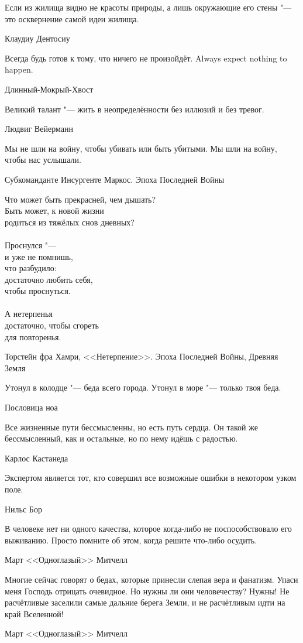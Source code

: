 \epigraph
{Если из жилища видно не красоты природы, а лишь окружающие его стены "--- это осквернение самой идеи жилища.}
{Клаудиу Дентосиу}

\epigraph{
{Всегда будь готов к тому, что ничего не произойдёт.}
{Always expect nothing to happen.}
}{Длинный-Мокрый-Хвост}

\epigraph
{Великий талант "--- жить в неопределённости без иллюзий и без тревог.}
{Людвиг Вейерманн}

\epigraph
{Мы не шли на войну, чтобы убивать или быть убитыми.
Мы шли на войну, чтобы нас услышали.}
{Субкоманданте Инсургенте Маркос.
Эпоха Последней Войны}

\epigraph
{Что может быть прекрасней, чем дышать?\\
Быть может, к новой жизни\\
родиться из тяжёлых снов дневных?\\
~\\
Проснулся "---\\
и уже не помнишь,\\
что разбудило:\\
достаточно любить себя,\\
чтобы проснуться.\\
~\\
А нетерпенья\\
достаточно, чтобы сгореть\\
для повторенья.}
{Торстейн фра Хамри, <<Нетерпение>>.
Эпоха Последней Войны, Древняя Земля}

\epigraph
{Утонул в колодце "--- беда всего города.
Утонул в море "--- только твоя беда.}
{Пословица ноа}

\epigraph
{Все жизненные пути бессмысленны, но есть путь сердца.
Он такой же бессмысленный, как и остальные, но по нему идёшь с радостью.}
{Карлос Кастанеда}

\epigraph
{Экспертом является тот, кто совершил все возможные ошибки в некотором узком поле.}
{Нильс Бор}

\epigraph
{В человеке нет ни одного качества, которое когда-либо не поспособствовало его выживанию.
Просто помните об этом, когда решите что-либо осудить.}
{Март <<Одноглазый>> Митчелл}

\epigraph
{Многие сейчас говорят о бедах, которые принесли слепая вера и фанатизм.
Упаси меня Господь отрицать очевидное.
Но нужны ли они человечеству?
Нужны!
Не расчётливые заселили самые дальние берега Земли, и не расчётливым идти на край Вселенной!}
{Март <<Одноглазый>> Митчелл}

